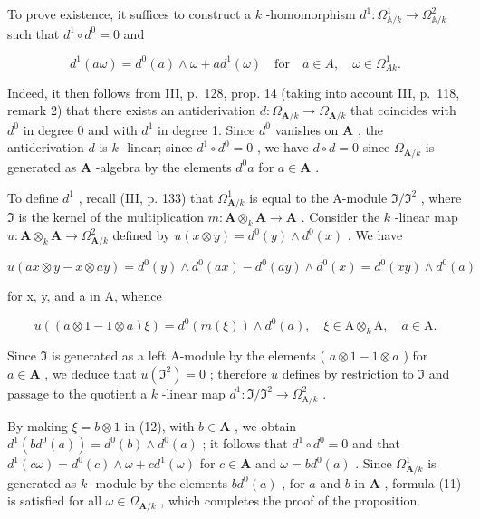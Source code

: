 To prove existence, it suffices to construct a \(k\) -homomorphism \(d^{1}:\Omega_{\mathbb{A}/k}^{1}\to\Omega_{\mathbb{A}/k}^{2}\) such that \(d^{1}\circ d^{0}=0\) and

\[
d ^ {1} (a \omega) = d ^ {0} (a) \wedge \omega + a d ^ {1} (\omega) \quad \text {for} \quad a \in A, \quad \omega \in \Omega_ {A k} ^ {1}.\tag{11}
\]

Indeed, it then follows from III, p.~128, prop. 14 (taking into account III, p.~118, remark 2) that there exists an antiderivation \(d: \Omega_{\mathbf{A}/k} \to \Omega_{\mathbf{A}/k}\) that coincides with \(d^{0}\) in degree 0 and with \(d^{1}\) in degree 1. Since \(d^{0}\) vanishes on \(\mathbf{A}\) , the antiderivation \(d\) is \(k\) -linear; since \(d^{1} \circ d^{0} = 0\) , we have \(d \circ d = 0\) since \(\Omega_{\mathbf{A}/k}\) is generated as \(\mathbf{A}\) -algebra by the elements \(d^{0} a\) for \(a \in \mathbf{A}\) .

To define \(d^{1}\) , recall (III, p. 133) that \(\Omega_{\mathbf{A}/k}^{1}\) is equal to the A-module \(\mathfrak{I}/\mathfrak{I}^{2}\) , where \(\mathfrak{I}\) is the kernel of the multiplication \(m: \mathbf{A} \otimes_{k} \mathbf{A} \to \mathbf{A}\) . Consider the \(k\) -linear map \(u: \mathbf{A} \otimes_{k} \mathbf{A} \to \Omega_{\mathbf{A}/k}^{2}\) defined by \(u(x \otimes y) = d^{0}(y) \wedge d^{0}(x)\) . We have

\[
u (a x \otimes y - x \otimes a y) = d ^ {0} (y) \wedge d ^ {0} (a x) - d ^ {0} (a y) \wedge d ^ {0} (x) = d ^ {0} (x y) \wedge d ^ {0} (a)
\]

for x, y, and a in A, whence

\[
u ((a \otimes 1 - 1 \otimes a) \xi) = d ^ {0} (m (\xi)) \wedge d ^ {0} (a), \quad \xi \in \mathrm{A} \otimes_ {k} \mathrm{A}, \quad a \in \mathrm{A}. \tag {12}
\]

Since \(\mathfrak{I}\) is generated as a left A-module by the elements ( \(a \otimes 1 - 1 \otimes a\) ) for \(a \in \mathbf{A}\) , we deduce that \(u(\mathfrak{I}^2) = 0\) ; therefore \(u\) defines by restriction to \(\mathfrak{I}\) and passage to the quotient a \(k\) -linear map \(d^1: \mathfrak{I}/\mathfrak{I}^2 \to \Omega_{\mathrm{A}/k}^2\) .

By making \(\xi = b \otimes 1\) in (12), with \(b \in \mathbf{A}\) , we obtain \(d^{1}(bd^{0}(a)) = d^{0}(b) \wedge d^{0}(a)\) ; it follows that \(d^{1} \circ d^{0} = 0\) and that \(d^{1}(c\omega) = d^{0}(c) \wedge \omega + cd^{1}(\omega)\) for \(c \in \mathbf{A}\) and \(\omega = bd^{0}(a)\) . Since \(\Omega_{\mathbf{A}/k}^{1}\) is generated as \(k\) -module by the elements \(bd^{0}(a)\) , for \(a\) and \(b\) in \(\mathbf{A}\) , formula (11) is satisfied for all \(\omega \in \Omega_{\mathbf{A}/k}\) , which completes the proof of the proposition.

